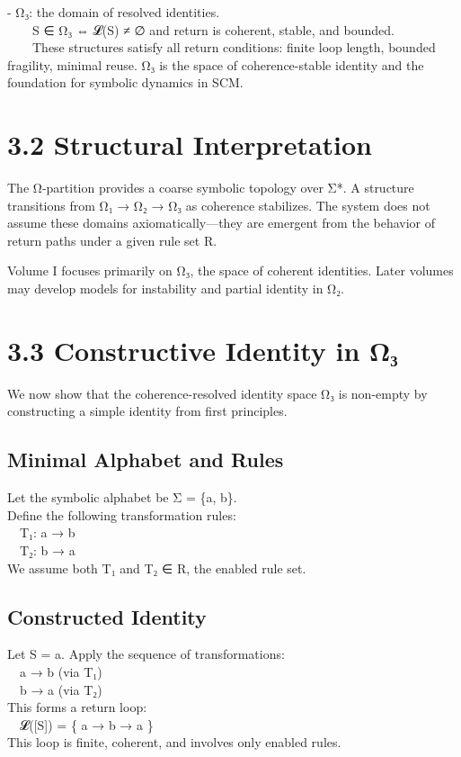 - Ω₃: the domain of resolved identities.\\
  S ∈ Ω₃ ⇔ 𝓛(S) ≠ ∅ and return is coherent, stable, and bounded.\\
  These structures satisfy all return conditions: finite loop length,
bounded fragility, minimal reuse. Ω₃ is the space of coherence-stable
identity and the foundation for symbolic dynamics in SCM.

\section{3.2 \textbar{} Structural
Interpretation}\label{structural-interpretation}

The Ω-partition provides a coarse symbolic topology over Σ*. A structure
transitions from Ω₁ → Ω₂ → Ω₃ as coherence stabilizes. The system does
not assume these domains axiomatically---they are emergent from the
behavior of return paths under a given rule set R.

Volume I focuses primarily on Ω₃, the space of coherent identities.
Later volumes may develop models for instability and partial identity in
Ω₂.

\section{3.3 \textbar{} Constructive Identity in
Ω₃}\label{constructive-identity-in-ux3c9ux2083}

We now show that the coherence-resolved identity space Ω₃ is non-empty
by constructing a simple identity from first principles.

\subsection{Minimal Alphabet and
Rules}\label{minimal-alphabet-and-rules}

Let the symbolic alphabet be Σ = \{a, b\}.\\
Define the following transformation rules:\\
 T₁: a → b\\
 T₂: b → a\\
We assume both T₁ and T₂ ∈ R, the enabled rule set.

\subsection{Constructed Identity}\label{constructed-identity}

Let S = a. Apply the sequence of transformations:\\
 a → b (via T₁)\\
 b → a (via T₂)\\
This forms a return loop:\\
 𝓛({[}S{]}) = \{ a → b → a \}\\
This loop is finite, coherent, and involves only enabled rules.

